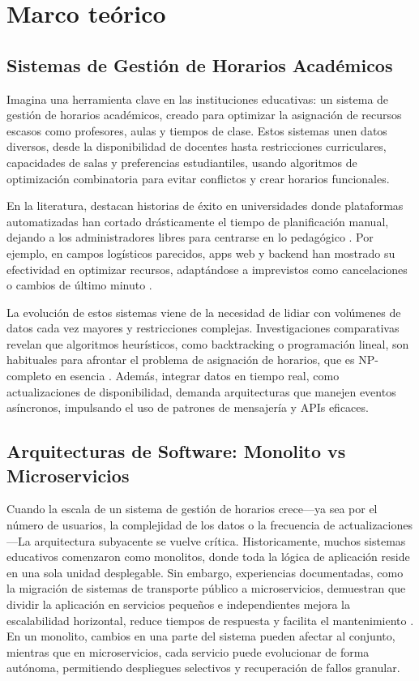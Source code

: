 \section{Marco teórico}
\subsection{Sistemas de Gestión de Horarios Académicos}
Imagina una herramienta clave en las instituciones educativas: un sistema de gestión de horarios académicos, creado para optimizar la asignación de recursos escasos como profesores, aulas y tiempos de clase. Estos sistemas unen datos diversos, desde la disponibilidad de docentes hasta restricciones curriculares, capacidades de salas y preferencias estudiantiles, usando algoritmos de optimización combinatoria para evitar conflictos y crear horarios funcionales.

En la literatura, destacan historias de éxito en universidades donde plataformas automatizadas han cortado drásticamente el tiempo de planificación manual, dejando a los administradores libres para centrarse en lo pedagógico \cite{desarrollo2025}. Por ejemplo, en campos logísticos parecidos, apps web y backend han mostrado su efectividad en optimizar recursos, adaptándose a imprevistos como cancelaciones o cambios de último minuto \cite{macias2021}.

La evolución de estos sistemas viene de la necesidad de lidiar con volúmenes de datos cada vez mayores y restricciones complejas. Investigaciones comparativas revelan que algoritmos heurísticos, como backtracking o programación lineal, son habituales para afrontar el problema de asignación de horarios, que es NP-completo en esencia \cite{torres2020}. Además, integrar datos en tiempo real, como actualizaciones de disponibilidad, demanda arquitecturas que manejen eventos asíncronos, impulsando el uso de patrones de mensajería y APIs eficaces.

\subsection{Arquitecturas de Software: Monolito vs Microservicios}
Cuando la escala de un sistema de gestión de horarios crece—ya sea por el número de usuarios, la complejidad de los datos o la frecuencia de actualizaciones—La arquitectura subyacente se vuelve crítica. Historicamente, muchos sistemas educativos comenzaron como monolitos, donde toda la lógica de aplicación reside en una sola unidad desplegable. Sin embargo, experiencias documentadas, como la migración de sistemas de transporte público a microservicios, demuestran que dividir la aplicación en servicios pequeños e independientes mejora la escalabilidad horizontal, reduce tiempos de respuesta y facilita el mantenimiento \cite{torres2020}. En un monolito, cambios en una parte del sistema pueden afectar al conjunto, mientras que en microservicios, cada servicio puede evolucionar de forma autónoma, permitiendo despliegues selectivos y recuperación de fallos granular.

